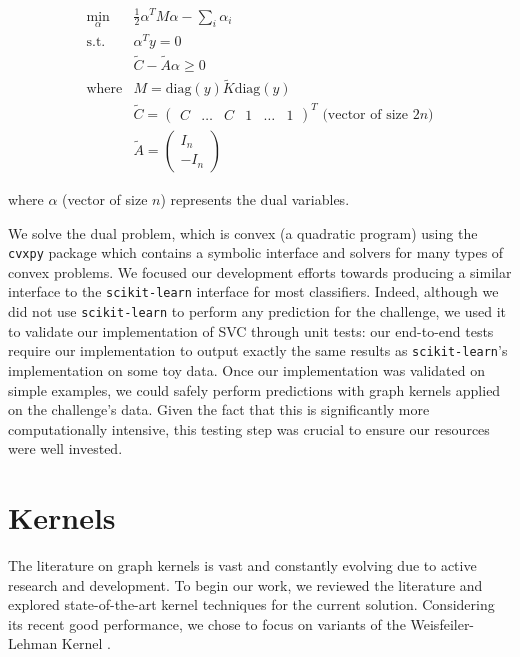 \documentclass{IEEEtran}
\begin{document}
\begin{equation}
    \label{eq:dual_svc}
    \begin{split}
        \min_{\alpha} & \frac{1}{2} \alpha^T M \alpha - \sum_i \alpha_i\\
        \text{s.t.} & \alpha^T y = 0\\
        & \tilde{C} - \tilde{A}\alpha \geq 0\\
        \text{where} & M = \text{diag}(y) \tilde{K} \text{diag}(y)\\
        & \tilde{C} = \begin{pmatrix} C & \dots & C & 1 & \dots & 1 \end{pmatrix}^T \text{ (vector of size }2n \text{)}\\
        & \tilde{A} = \begin{pmatrix} I_n \\ -I_n \end{pmatrix}
    \end{split}
\end{equation}

where $\alpha$ (vector of size $n$) represents the dual variables.

We solve the dual problem, which is convex (a quadratic program) using the \texttt{cvxpy} package which contains a symbolic interface and solvers for many types of convex problems.
We focused our development efforts towards producing a similar interface to the \texttt{scikit-learn} interface for most classifiers.
Indeed, although we did not use \texttt{scikit-learn} to perform any prediction for the challenge, we used it to validate our implementation of SVC through unit tests: our end-to-end tests require our implementation to output exactly the same results as \texttt{scikit-learn}'s implementation on some toy data.
Once our implementation was validated on simple examples, we could safely perform predictions with graph kernels applied on the challenge's data.
Given the fact that this is significantly more computationally intensive, this testing step was crucial to ensure our resources were well invested.

\section{Kernels}

The literature on graph kernels is vast and constantly
evolving due to active research and development.
To begin our work, we reviewed the literature and explored
state-of-the-art kernel techniques for the current solution.
Considering its recent good performance,
we chose to focus on variants of the Weisfeiler-Lehman Kernel \cite{shervashidze11a}.
\end{document}
